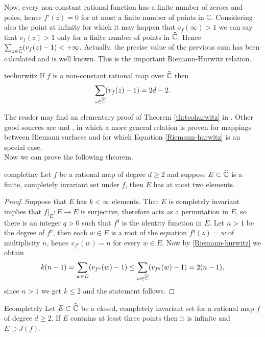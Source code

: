 Now, every non-constant rational function has a finite number of zeroes and poles, hence $f'(z)= 0$ for at most a finite number of points in $\mathbb{C}$. Considering also the point at infinity for which it may happen that $v_f(\infty)>1$ we can say that $v_f(z)>1$ only for a finite number of points in $\widehat{\mathbb{C}}$. Hence $\sum_{z\in \widehat{\mathbb{C}}}(v_f(z)-1)<+\infty$. Actually, the precise value of the previous sum has been calculated and is well known. This is the important Riemann-Hurwitz relation.

\begin{mytheo}{}{teohurwitz}
If $f$ is a non-constant rational map over $\widehat{\mathbb{C}}$ then
\begin{equation}\label{Riemann-hurwitz}
\sum_{z\in \widehat{\mathbb{C}}}(v_f(z)-1) = 2d-2.
\end{equation}
\end{mytheo}

The reader may find an elementary proof of Theorem \ref{th:teohurwitz} in \cite[Theorem 2.7.1]{beardon}. Other good sources are \cite{farkas} and \cite{forster}, in which a more general relation is proven for mappings between Riemann surfaces and for which Equation \eqref{Riemann-hurwitz} is an special case.\\

Now we can prove the following theorem.
\begin{mytheo}{}{completinv}
Let $f$ be a rational map of degree $d\geq 2$ and suppose $E\subset \widehat{\mathbb{C}}$ is a finite, completely invariant set under $f$, then $E$ has at most two elements.
\end{mytheo}

\begin{proof}
Suppose that $E$ has $k<\infty$ elements. That $E$ is completely invariant implies that $f|_E:E\rightarrow E$ is surjective, therefore acts as a permutation in $E$, so there is an integer $q>0$ such that $f^q$ is the identity function in $E$. Let $n>1$ be the degree of $f^q$, then each $w\in E$ is a root of the equation $f^q(z)=w$ of multiplicity $n$, hence $v_{f^q}(w) = n$ for every $w\in E$. Now by \eqref{Riemann-hurwitz} we obtain
$$k(n-1) = \sum_{w\in E}(v_{f^q}(w)-1) \leq \sum_{w\in \widehat{\mathbb{C}}}(v_{f^q}(w)-1) = 2(n-1),$$
since $n>1$ we get $k\leq 2$ and the statement follows.
\end{proof}

\begin{mycoro}{}{Ecompletely}
Let $E\subset \widehat{\mathbb{C}}$ be a closed, completely invariant set for a rational map $f$ of degree $d\geq 2$. If $E$ contains at least three points then it is infinite and $E\supset J(f)$.
\end{mycoro}

